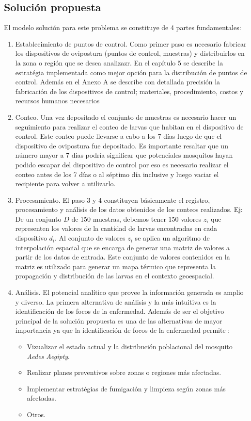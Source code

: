\subsection{Solución propuesta}
El modelo solución para este problema se constituye de 4 partes fundamentales:
\begin{enumerate}[style=multiline,leftmargin=1.5cm]
    \item Establecimiento de puntos de control. Como primer paso es necesario fabricar los dispositivos de ovipostura (puntos de control, muestras) y distribuirlos en la zona o región que se desea analizazr. En el capítulo 5 se describe la estratégia implementada como mejor opción para la distribución de puntos de control. Además en el Anexo A se describe con detallada precisión la fabricación de los dispositivos de control; materiales, procedimiento, costos y recursos humanos necesarios
    
    \item Conteo. Una vez depositado el conjunto de muestras es necesario hacer un seguimiento para realizar el conteo de larvas que habitan en el dispositivo de control. Este conteo puede llevarse a cabo a los 7 días luego de que el dispositivo de ovipostura fue depositado. Es importante resaltar que un número mayor a 7 días podría significar que potenciales mosquitos hayan podido escapar del dispositivo de control por eso es necesario realizar el conteo antes de los 7 días o al séptimo día inclusive y luego vaciar el recipiente para volver a utilizarlo. 
    
    \item Procesamiento. El paso 3 y 4 constituyen básicamente el registro, procesamiento y análisis de los datos obtenidos de los conteos realizados. Ej: De un conjunto $D$ de 150 muestras, debemos tener 150 valores $z_{i}$ que representen los valores de la cantidad de larvas encontradas en cada dispositivo $d_{i}$. Al conjunto de valores $z_{i}$ se aplica un algoritmo de interpolación espacial que se encarga de generar una matriz de valores a partir de los datos de entrada. Este conjunto de valores contenidos en la matriz es utilizado para generar un mapa térmico que representa la propagación y distribución de las larvas en el contexto geoespacial.

    \item Análisis. El potencial analítico que provee la información generada es amplio y diverso. La primera alternativa de análisis y la más intuitiva es la identificación de los focos de la enfermedad. Además de ser el objetivo principal de la solución propuesta es una de las alternativas de mayor importancia ya que la identificación de focos de la enfermedad permite :
\begin{itemize}
\item Vizualizar el estado actual y la distribución poblacional del mosquito \textit{Aedes Aegipty}.
\item Realizar planes preventivos sobre zonas o regiones más afectadas.
\item Implementar estratégias de fumigación y limpieza según zonas más afectadas.
\item Otros.
\end{itemize}
\end{enumerate}
